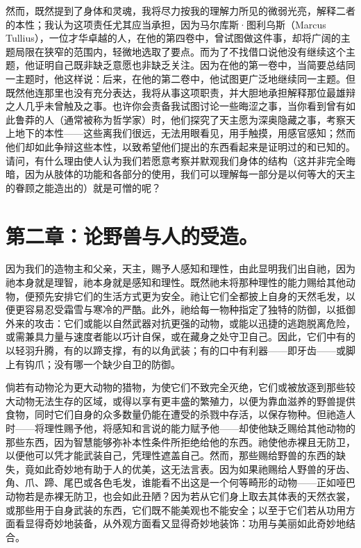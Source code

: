 然而，既然提到了身体和灵魂，我将尽力按我的理解力所见的微弱光亮，解释二者的本性；我认为这项责任尤其应当承担，因为马尔库斯·图利乌斯（Marcus Tullius），一位才华卓越的人，在他的第四卷中，曾试图做这件事，却将广阔的主题局限在狭窄的范围内，轻微地选取了要点。而为了不找借口说他没有继续这个主题，他证明自己既非缺乏意愿也非缺乏关注。因为在他的第一卷中，当简要总结同一主题时，他这样说：后来，在他的第二卷中，他试图更广泛地继续同一主题。但既然他连那里也没有充分表达，我将从事这项职责，并大胆地承担解释那位最雄辩之人几乎未曾触及之事。也许你会责备我试图讨论一些晦涩之事，当你看到曾有如此鲁莽的人（通常被称为哲学家）时，他们探究了天主愿为深奥隐藏之事，考察天上地下的本性——这些离我们很远，无法用眼看见，用手触摸，用感官感知；然而他们却如此争辩这些本性，以致希望他们提出的东西看起来是证明过的和已知的。请问，有什么理由使人认为我们若愿意考察并默观我们身体的结构（这并非完全晦暗，因为从肢体的功能和各部分的使用，我们可以理解每一部分是以何等大的天主的眷顾之能造出的）就是可憎的呢？\par


\section{第二章：论野兽与人的受造。}

因为我们的造物主和父亲，天主，赐予人感知和理性，由此显明我们出自祂，因为祂本身就是理智，祂本身就是感知和理性。既然祂未将那种理性的能力赐给其他动物，便预先安排它们的生活方式更为安全。祂让它们全都披上自身的天然毛发，以便更容易忍受霜雪与寒冷的严酷。此外，祂给每一物种指定了独特的防御，以抵御外来的攻击：它们或能以自然武器对抗更强的动物，或能以迅捷的逃跑脱离危险，或需兼具力量与速度者能以巧计自保，或在藏身之处守卫自己。因此，它们中有的以轻羽升腾，有的以蹄支撑，有的以角武装；有的口中有利器——即牙齿——或脚上有钩爪；没有哪一个缺少自卫的防御。\par

倘若有动物沦为更大动物的猎物，为使它们不致完全灭绝，它们或被放逐到那些较大动物无法生存的区域，或得以享有更丰盛的繁殖力，以便为靠血滋养的野兽提供食物，同时它们自身的众多数量仍能在遭受的杀戮中存活，以保存物种。但祂造人时——将理性赐予他，将感知和言说的能力赋予他——却使他缺乏赐给其他动物的那些东西，因为智慧能够弥补本性条件所拒绝给他的东西。祂使他赤裸且无防卫，以便他可以凭才能武装自己，凭理性遮盖自己。然而，那些赐给野兽的东西的缺失，竟如此奇妙地有助于人的优美，这无法言表。因为如果祂赐给人野兽的牙齿、角、爪、蹄、尾巴或各色毛发，谁能看不出这是一个何等畸形的动物——正如哑巴动物若是赤裸无防卫，也会如此丑陋？因为若从它们身上取去其体表的天然衣裳，或那些用于自身武装的东西，它们既不能美观也不能安全；以至于它们若从功用方面看显得奇妙地装备，从外观方面看又显得奇妙地装饰：功用与美丽如此奇妙地结合。\par

